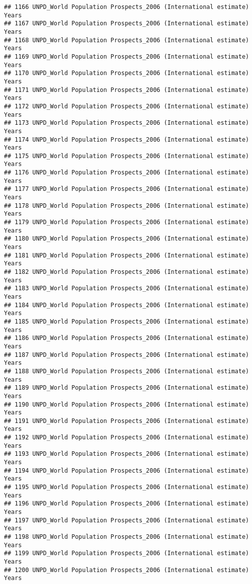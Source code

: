 \documentclass[]{article}
\begin{document}
\begin{verbatim}
## 1166 UNPD_World Population Prospects_2006 (International estimate) Years
## 1167 UNPD_World Population Prospects_2006 (International estimate) Years
## 1168 UNPD_World Population Prospects_2006 (International estimate) Years
## 1169 UNPD_World Population Prospects_2006 (International estimate) Years
## 1170 UNPD_World Population Prospects_2006 (International estimate) Years
## 1171 UNPD_World Population Prospects_2006 (International estimate) Years
## 1172 UNPD_World Population Prospects_2006 (International estimate) Years
## 1173 UNPD_World Population Prospects_2006 (International estimate) Years
## 1174 UNPD_World Population Prospects_2006 (International estimate) Years
## 1175 UNPD_World Population Prospects_2006 (International estimate) Years
## 1176 UNPD_World Population Prospects_2006 (International estimate) Years
## 1177 UNPD_World Population Prospects_2006 (International estimate) Years
## 1178 UNPD_World Population Prospects_2006 (International estimate) Years
## 1179 UNPD_World Population Prospects_2006 (International estimate) Years
## 1180 UNPD_World Population Prospects_2006 (International estimate) Years
## 1181 UNPD_World Population Prospects_2006 (International estimate) Years
## 1182 UNPD_World Population Prospects_2006 (International estimate) Years
## 1183 UNPD_World Population Prospects_2006 (International estimate) Years
## 1184 UNPD_World Population Prospects_2006 (International estimate) Years
## 1185 UNPD_World Population Prospects_2006 (International estimate) Years
## 1186 UNPD_World Population Prospects_2006 (International estimate) Years
## 1187 UNPD_World Population Prospects_2006 (International estimate) Years
## 1188 UNPD_World Population Prospects_2006 (International estimate) Years
## 1189 UNPD_World Population Prospects_2006 (International estimate) Years
## 1190 UNPD_World Population Prospects_2006 (International estimate) Years
## 1191 UNPD_World Population Prospects_2006 (International estimate) Years
## 1192 UNPD_World Population Prospects_2006 (International estimate) Years
## 1193 UNPD_World Population Prospects_2006 (International estimate) Years
## 1194 UNPD_World Population Prospects_2006 (International estimate) Years
## 1195 UNPD_World Population Prospects_2006 (International estimate) Years
## 1196 UNPD_World Population Prospects_2006 (International estimate) Years
## 1197 UNPD_World Population Prospects_2006 (International estimate) Years
## 1198 UNPD_World Population Prospects_2006 (International estimate) Years
## 1199 UNPD_World Population Prospects_2006 (International estimate) Years
## 1200 UNPD_World Population Prospects_2006 (International estimate) Years

\end{verbatim}
\end{document}
